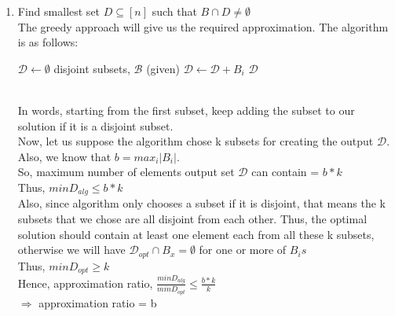 \documentclass[11pt]{article}
\begin{document}
\begin{enumerate}
    \item Find smallest set $D \subseteq [n]$ such that $B \cap D \neq \emptyset $ \\
    The greedy approach will give us the required approximation. The algorithm is as follows:   
    \begin{algorithm}
  \begin{algorithmic}
      \State $\mathcal{D} \leftarrow \emptyset$
      \State disjoint subsets, $\mathcal{B}$ (given)
            \State $\mathcal{D} \leftarrow \mathcal{D} + B_i$
         \EndIf
        \EndFor
      \State \Return $\mathcal{D}$
    \EndFunction
  \end{algorithmic}
\end{algorithm}\\
In words, starting from the first subset, keep adding the subset to our solution if it is a disjoint subset. \\
Now, let us suppose the algorithm chose k subsets for creating the output $\mathcal{D}$. Also, we know that $b = max_i |B_i|$. \\
So, maximum number of elements output set $\mathcal{D}$ can contain = $b*k$\\
Thus, $minD_{alg} \leq b*k$ \\
Also, since algorithm only chooses a subset if it is disjoint, that means the k subsets that we chose are all disjoint from each other. 
Thus, the optimal solution should contain at least one element each from all these k subsets, otherwise we will have $\mathcal{D}_{opt} 
\cap B_x = \emptyset$ for one or more of $B_i s$\\
Thus, $minD_{opt} \geq k$ \\
Hence, approximation ratio, $\frac{minD_{alg}}{minD_{opt}} \leq \frac{b*k}{k}$ \\
$\Longrightarrow$ approximation ratio = b
\end{enumerate}

\newpage
\end{document}
